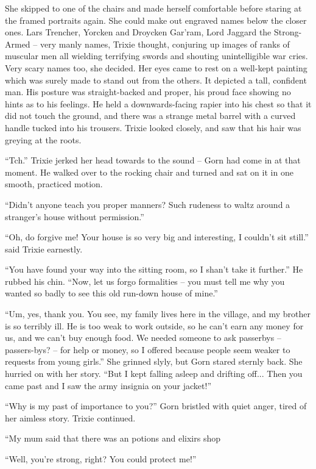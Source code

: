 She skipped to one of the chairs and made herself comfortable before staring at
the framed portraits again. She could make out engraved names below the closer
ones. Lars Trencher, Yorcken and Droycken Gar'ram, Lord Jaggard the Strong-Armed
-- very manly names, Trixie thought, conjuring up images of ranks of muscular
men all wielding terrifying swords and shouting unintelligible war cries. Very
scary names too, she decided. Her eyes came to rest on a well-kept painting
which was surely made to stand out from the others. It depicted a tall,
confident man. His posture was straight-backed and proper, his proud face
showing no hints as to his feelings.  He held a downwards-facing rapier into his
chest so that it did not touch the ground, and there was a strange metal barrel
with a curved handle tucked into his trousers. Trixie looked closely, and saw
that his hair was greying at the roots.

``Tch.'' Trixie jerked her head towards to the sound -- Gorn had come in at that
moment. He walked over to the rocking chair and turned and sat on it in one
smooth, practiced motion.

``Didn't anyone teach you proper manners? Such rudeness to waltz around a
stranger's house without permission.''

``Oh, do forgive me! Your house is so very big and interesting, I couldn't sit
still.'' said Trixie earnestly.

``You have found your way into the sitting room, so I shan't take it further.''
He rubbed his chin. ``Now, let us forgo formalities -- you must tell me why you
wanted so badly to see this old run-down house of mine.''

``Um, yes, thank you. You see, my family lives here in the village, and my
brother is so terribly ill. He is too weak to work outside, so he can't earn any
money for us, and we can't buy enough food. We needed someone to ask passerbys
-- passers-bys?  -- for help or money, so I offered because people seem weaker
to requests from young girls.'' She grinned slyly, but Gorn stared sternly back.
She hurried on with her story. ``But I kept falling asleep and drifting off...
Then you came past and I saw the army insignia on your jacket!''

``Why is my past of importance to you?'' Gorn bristled with quiet anger, tired
of her aimless story. Trixie continued.

``My mum said that there was an potions and elixirs shop 



``Well, you're strong, right? You could protect me!''
